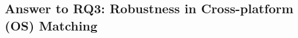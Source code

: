 



\subsection{Answer to RQ3: Robustness in Cross-platform (OS) Matching}\label{sec:evaluation_rq2}
